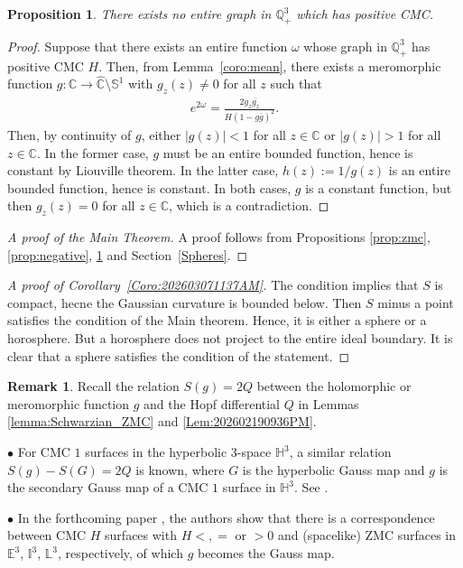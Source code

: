 \documentclass[12pt,reqno]{amsart}
\theoremstyle{plain} %
\newtheorem{proposition}[theorem]{Proposition}
\theoremstyle{definition}
\newtheorem{remark}[theorem]{Remark}
\numberwithin{equation}{section}
\newcommand{\qthreep}{\mathbb{Q}^3_+}
\newcommand{\h}{H}%
\begin{document}
\begin{proposition}\label{prop:positive}
	There exists no entire graph in $\qthreep$ which has positive CMC.
\end{proposition}
\begin{proof}
	Suppose  that there exists an entire function $\omega$ whose  graph in $\qthreep$  has  positive CMC $\h$. Then, from  Lemma~\ref{coro:mean}, there exists a meromorphic function $g:\mathbb{C}\to\hat{\mathbb{C}}\setminus\mathbb{S}^1$ with $g_z(z) \ne 0$ for all $z$  such  that
	\begin{align}\label{Eq:202507081352}
		e^{2\omega} = \frac{2 g_z \overline{g_z}}{ \h (1-g\bar{g})^2}.
	\end{align}
	Then, by continuity of $g$, either $|g(z)|<1$ for all $z\in\mathbb{C}$ or $|g(z)|>1$ for all $z\in\mathbb{C}$. In the former case, $g$ must be an  entire bounded function, hence is constant by Liouville theorem. In the latter case, $h(z):=1/g(z)$ is an entire bounded function, hence is constant. In both cases, $g$ is a constant function, but then $g_z(z) = 0$ for all $z \in \mathbb{C}$, which is a contradiction.
\end{proof}


\begin{proof}[A proof of the Main Theorem]
	A proof follows from Propositions \ref{prop:zmc}, \ref{prop:negative}, \ref{prop:positive} and Section~\ref{Spheres}.
\end{proof}
\begin{proof}[A proof of Corollary~\ref{Coro:202603071137AM}]
	The condition implies that $S$ is compact, hecne the Gaussian curvature is bounded below. Then $S$ minus a point satisfies the condition of the Main theorem. Hence, it is either a sphere or a horosphere. But a horosphere does not project to the entire ideal boundary. It is clear that a sphere satisfies the condition of the statement.
\end{proof}

\begin{remark}
	Recall the relation $S(g)=2Q$ between the holomorphic or meromorphic function $g$ and the Hopf differential $Q$ in Lemmas \ref{lemma:Schwarzian_ZMC} and \ref{Lem:202602190936PM}.
  
        $\bullet$ For CMC $1$ surfaces in the hyperbolic $3$-space $\mathbb{H}^3$, a similar relation $S(g)-S(G)=2Q$ is known, where $G$ is the hyperbolic Gauss map and $g$ is the secondary Gauss map of a CMC $1$ surface in $\mathbb{H}^3$. See \cite{UY1}.

        $\bullet$ In the forthcoming paper \cite{ALY3}, the authors show that there is a correspondence between CMC $H$ surfaces with $H<,=$ or $>0$ and (spacelike) ZMC surfaces in $\mathbb{E}^3$,  $\mathbb{I}^3$,  $\mathbb{L}^3$, respectively, of which $g$ becomes the Gauss map.
\end{remark}
\end{document}
